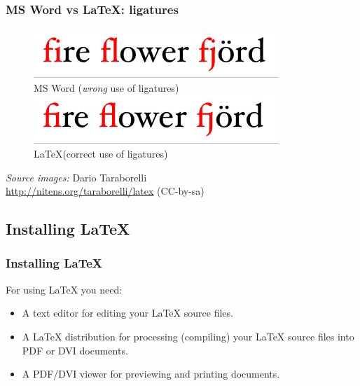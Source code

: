 \documentclass{beamer}
\begin{document}
\begin{frame}
\frametitle{MS Word vs \LaTeX: ligatures}



\begin{figure}[h]

\begin{center}
  \centering
	\includegraphics[scale=0.70,clip=true]{figs/ligatures_word.jpg} \\
 	\small MS Word (\textit{wrong} use of ligatures) \\
	\bigskip
	\includegraphics[scale=0.70,clip=true]{figs/ligatures_latex.jpg} \\
	\small \LaTeX (\alert{correct} use of ligatures) \\
\end{center}
\end{figure}

\pause

\begin{center}
\tiny \textit{Source images:} Dario Taraborelli \\ 
\url{http://nitens.org/taraborelli/latex} (CC-by-sa)
\end{center}

\end{frame}

\subsection{Installing \LaTeX}

\begin{frame}
\frametitle{Installing \LaTeX}

For using \LaTeX{} you need: 
\begin{itemize}
\item A \alert{text editor} for editing your \LaTeX{} source files.
\item A \alert{\LaTeX{} distribution} for processing (compiling) your \LaTeX{} source files into
PDF or DVI documents.
\item A \alert{PDF/DVI viewer} for previewing and printing documents.
\end{itemize}

\end{frame}
\end{document}
